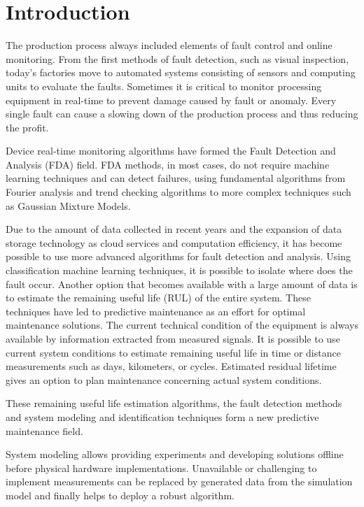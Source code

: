 \chapter{Introduction}

The production process always included elements of fault control and online
monitoring. From the first methods of fault detection, such as visual
inspection, today's factories move to automated systems consisting of
sensors and computing units to evaluate the faults. Sometimes it is
critical to monitor processing equipment in real-time to prevent damage
caused by fault or anomaly. Every single fault can cause a slowing down of
the production process and thus reducing the profit.

Device real-time monitoring algorithms have formed the Fault Detection and
Analysis (FDA) field.  FDA methods, in most cases, do not require machine
learning techniques and can detect failures, using fundamental algorithms
from Fourier analysis and trend checking algorithms to more complex
techniques such as Gaussian Mixture Models.

Due to the amount of data collected in recent years and the expansion of
data storage technology as cloud services and computation efficiency, it
has become possible to use more advanced algorithms for fault detection and
analysis. Using classification machine learning techniques, it is possible
to isolate where does the fault occur.  Another option that becomes
available with a large amount of data is to estimate the remaining useful
life (RUL) of the entire system. These techniques have led to predictive
maintenance as an effort for optimal maintenance solutions. The current
technical condition of the equipment is always available by information
extracted from measured signals. It is possible to use current system
conditions to estimate remaining useful life in time or distance
measurements such as days, kilometers, or cycles. Estimated residual
lifetime gives an option to plan maintenance concerning actual system
conditions.

These remaining useful life estimation algorithms, the fault detection
methods and system modeling and identification techniques form a new
predictive maintenance field.

System modeling allows providing experiments and developing solutions
offline before physical hardware implementations. Unavailable or
challenging to implement measurements can be replaced by generated data
from the simulation model and finally helps to deploy a robust algorithm.

